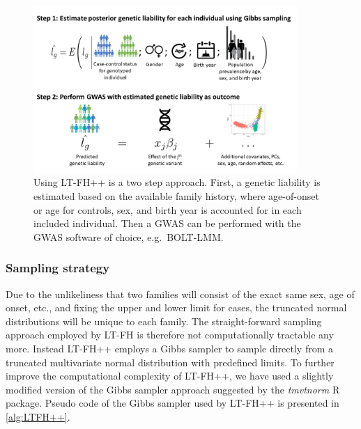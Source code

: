 \begin{figure}
	\includegraphics[width=10cm]{methods/ltfhpp_steps.png}
	\caption[Overview of LT-FH++ and what information it can account for in GWAS]{
		Using LT-FH++ is a two step approach. First, a genetic liability is estimated based on the available family history, where age-of-onset or age for controls, sex, and birth year is accounted for in each included individual. Then a GWAS can be performed with the GWAS software of choice, e.g.\ BOLT-LMM.
	} %
	\label{fig:LTFHppFigure1}
\end{figure}

\subsubsection{Sampling strategy}

Due to the unlikeliness that two families will consist of the exact same sex, age of onset, etc., and fixing the upper and lower limit for cases, the truncated normal distributions will be unique to each family. The straight-forward sampling approach employed by LT-FH is therefore not computationally tractable any more. Instead LT-FH++ employs a Gibbs sampler to sample directly from a truncated multivariate normal distribution with predefined limits. To further improve the computational complexity of LT-FH++, we have used a slightly modified version of the Gibbs sampler approach suggested by the \textit{tmvtnorm} R package\cite{wilhelm2015gibbs,wilhelm2010tmvtnorm}. Pseudo code of the Gibbs sampler used by LT-FH++ is presented in \cref{alg:LTFH++}.


